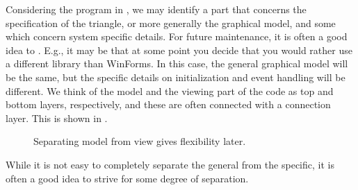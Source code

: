 \documentclass[fsharpnotes.tex]{subfiles}
\begin{document}
Considering the program in , we may identify a part that concerns the specification of the triangle, or more generally the graphical model, and some which concern system specific details. For future maintenance, it is often a good idea to . E.g., it may be that at some point you decide that you would rather use a different library than WinForms. In this case, the general graphical model will be the same, but the specific details on initialization and event handling will be different. We think of the model and the viewing part of the code as top and bottom layers, respectively, and these are often connected with a connection layer. This  is shown in .
\begin{figure}
  \centering
  \caption{Separating model from view gives flexibility later.}
  \label{fig:modelView}
\end{figure}
While it is not easy to completely separate the general from the specific, it is often a good idea to strive for some degree of separation.
\end{document}
